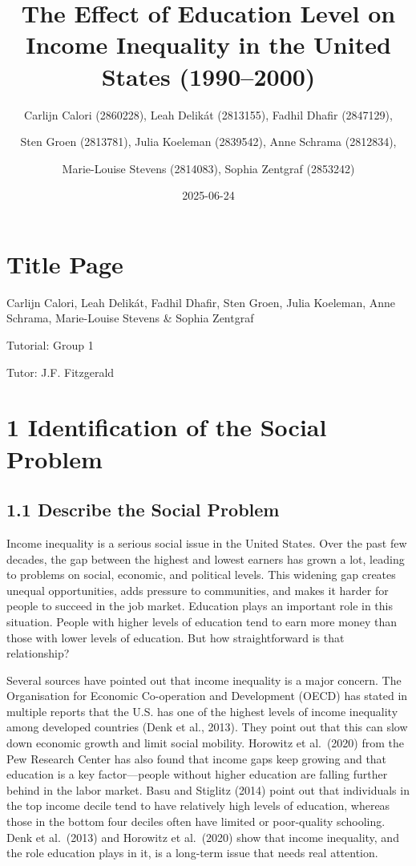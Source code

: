 \documentclass[
]{article}
\title{The Effect of Education Level on Income Inequality in the United
States (1990--2000)}
\author{Carlijn Calori (2860228), Leah Delikát (2813155), Fadhil Dhafir
(2847129), \and Sten Groen (2813781), Julia Koeleman (2839542), Anne
Schrama (2812834), \and Marie-Louise Stevens (2814083), Sophia Zentgraf
(2853242)}
\date{2025-06-24}
\begin{document}
\maketitle

\section{Title Page}\label{title-page}

Carlijn Calori, Leah Delikát, Fadhil Dhafir, Sten Groen, Julia Koeleman,
Anne Schrama, Marie-Louise Stevens \& Sophia Zentgraf

Tutorial: Group 1

Tutor: J.F. Fitzgerald

\section{1 Identification of the Social
Problem}\label{identification-of-the-social-problem}

\subsection{1.1 Describe the Social
Problem}\label{describe-the-social-problem}

Income inequality is a serious social issue in the United States. Over
the past few decades, the gap between the highest and lowest earners has
grown a lot, leading to problems on social, economic, and political
levels. This widening gap creates unequal opportunities, adds pressure
to communities, and makes it harder for people to succeed in the job
market. Education plays an important role in this situation. People with
higher levels of education tend to earn more money than those with lower
levels of education. But how straightforward is that relationship?

Several sources have pointed out that income inequality is a major
concern. The Organisation for Economic Co-operation and Development
(OECD) has stated in multiple reports that the U.S. has one of the
highest levels of income inequality among developed countries (Denk et
al., 2013). They point out that this can slow down economic growth and
limit social mobility. Horowitz et al.~(2020) from the Pew Research
Center has also found that income gaps keep growing and that education
is a key factor---people without higher education are falling further
behind in the labor market. Basu and Stiglitz (2014) point out that
individuals in the top income decile tend to have relatively high levels
of education, whereas those in the bottom four deciles often have
limited or poor-quality schooling. Denk et al.~(2013) and Horowitz et
al.~(2020) show that income inequality, and the role education plays in
it, is a long-term issue that needs real attention.
\end{document}
